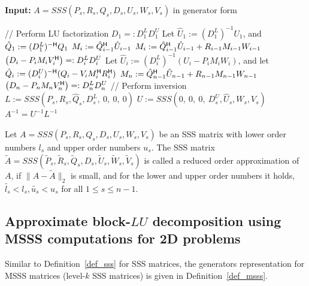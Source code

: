 {\begin{algorithm}[ht]
\begin{algorithmic}[1]
 \State \parbox[t]{\dimexpr\linewidth-\algorithmicindent}{\textbf{Input:} $A = SSS(P_s, R_s, Q_s, D_s, U_s, W_s, V_s)$ in generator form\strut} 
\State // Perform LU factorization
\State $ D_1 =: D_1^L D_1^U$ 
\State Let $\hat{U}_1:=(D_1^L)^{-1}U_1$, and $\hat{Q}_1:=( D_1^L)^{-\mathsf{H}}Q_1$
\State $M_i:=\hat{Q}_{i-1}^{\mathsf{H}}\hat{U}_{i-1}$
\Else
\State $M_i:=\hat{Q}_{i-1}^{\mathsf{H}}\hat{U}_{i-1}+R_{i-1}M_{i-1}W_{i-1}$
\EndIf
\State $\left(D_i-P_iM_{i}V_i^{\mathsf{H}}\right) =: D_i^L D_i^U$ 
\State Let $\hat{U}_i:=(D_i^L)^{-1}(U_i-P_iM_{i}W_i)$, and
\State let $\hat{Q}_i:=(D_i^U)^{-\mathsf{H}}(Q_i-V_iM_{i}^{\mathsf{H}} R_i^{\mathsf{H}})$
\EndFor
\State $M_n:=\hat{Q}_{n-1}^{\mathsf{H}}\hat{U}_{n-1}+R_{n-1}M_{n-1}W_{n-1}$
\State $\left(D_n-P_nM_{n}V_n^{\mathsf{H}}\right) =: D_n^L D_n^U$ 
\State // Perform inversion
\State $L := SSS(P_s, R_s, \hat{Q}_s, D^L_s,\ 0,\ 0,\ 0)$
\State $U := SSS(0,\ 0,\ 0,\ D_s^U, \hat{U}_s, W_s, V_s)$
\State $A^{-1} = U^{-1} L^{-1}$ 
\EndProcedure
\end{algorithmic}
\end{algorithm}

\begin{definition}\label{mor_sss}
Let $A = SSS(P_s, R_s, Q_s, D_s, U_s, W_s, V_s)$ be an SSS matrix with lower order numbers $l_s$ and upper order numbers $u_s$. The SSS matrix $\tilde{A} = SSS(\tilde{P}_s, \tilde{R}_s, \tilde{Q}_s, D_s, \tilde{U}_s, \tilde{W}_s, \tilde{V}_s)$ is called a re\-duced order approximation of $A$, if $\| A - \tilde{A} \|_2$ is small, and for the lower and upper order numbers it holds, $\tilde{l_s} < l_s, \tilde{u_s} < u_s$ for all $1 \leq s \leq n-1$.
\end{definition}

\subsection{Approximate block-$LU$ decomposition using MSSS computations for 2D problems}
\label{ch:msss_lu}
Similar to Definition~\ref{def_sss} for SSS matrices, the generators representation for MSSS matrices (level-$k$ SSS matrices) is given in Definition~\ref{def_msss}.

}
